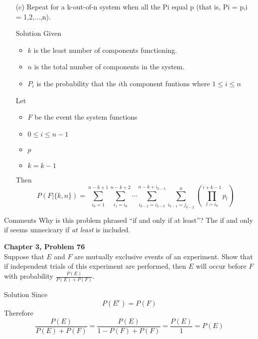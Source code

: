 \documentclass{article}
\begin{document}
\begin{spacing}{1.1}
\begin{homeworkProblem}
\begin{enumerate}[(a)]
\begin{homeworkSection}{Solution}
      \end{homeworkSection}
    \item[(c)] Repeat for a k-out-of-n system when all the Pi equal p (that is, Pi = p,i = 1,2,...,n).
      \begin{homeworkSection}{Solution}
        Given
          \begin{itemize}
            \item $k$ is the least number of components functioning.
            \item $n$ is the total number of components in the system.
            \item $P_i$ is the probability that the $i$th component funtions where $ 1 \le i \le n$
          \end{itemize}
        Let
          \begin{itemize}
            \item $F$ be the event the system functions
            \item $0 \le i \le n - 1$
            \item $p$
            \item $k = k - 1$
          \end{itemize}
        Then
          \[P( F|\{k,n\}) = \sum\limits_{i_0 = 1}^{n - k + 1}{ \sum\limits_{i_1 = i_0}^{n - k + 2}{ \cdots \sum\limits_{i_{k - 2} = i_{k - 3}}^{n - k + i_{k - 3}}{ \sum\limits_{i_{k - 1} = j_{k - 2}}^{n}{ \left(\prod\limits_{l = i_0}^{i + k - 1}{ p_l}\right)}}}}\]
      \end{homeworkSection}
  \end{enumerate}
      \begin{homeworkSection}{Comments}
        Why is this problem phrased ``if and only if at least''?  The if and only if seems unnecicary if \emph{at least} is included.
      \end{homeworkSection}
\end{homeworkProblem}
\newpage
\begin{homeworkProblem}
  {\bf Chapter 3, Problem 76}\\
  Suppose that $E$ and $F$ are mutually exclusive events of an experiment. 
  Show that if independent trials of this experiment are performed, 
  then $E$ will occur before $F$ with probability $\frac{ P( E)}{P( E) + P( F)}.$
  \begin{homeworkSection}{Solution}
    Since
      \[P( E^c) = P( F)\]
    Therefore
      \[\frac{ P( E)}{ P( E) + P( F)} = \frac{ P( E)}{ 1 - P( F) + P( F)} = \frac{ P( E)}{ 1} = P( E)\]
    

\end{homeworkSection}
\end{homeworkProblem}
\end{spacing}
\end{document}
